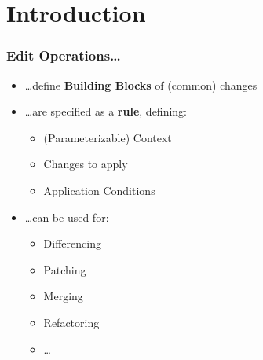 \section{Introduction}
\begin{frame}
\frametitle{Edit Operations\ldots}
\begin{itemize}
  \item \ldots define \textbf{Building Blocks} of (common) changes
  \item \ldots are specified as a \textbf{rule}, defining:
  \begin{itemize}
    \item  (Parameterizable) Context
    \item Changes to apply
    \item Application Conditions
\end{itemize} 
  \item \ldots can be used for:
  \begin{itemize}
    \item Differencing
    \item Patching
    \item Merging
    \item Refactoring
    \item \ldots
    \end{itemize}
\end{itemize} 
\end{frame}

